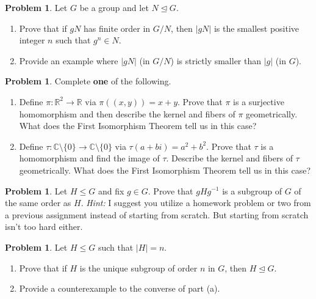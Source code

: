 \documentclass[11pt]{scrartcl}
\theoremstyle{definition}
\newtheorem{problem}[theorem]{Problem}
\begin{document}
\begin{problem}
Let $G$ be a group and let $N\unlhd G$. 
\begin{enumerate}[label=\rm{(\alph*)}]
\item Prove that if $gN$ has finite order in $G/N$, then $|gN|$ is the smallest positive integer $n$ such that $g^n\in N$.
\item Provide an example where $|gN|$ (in $G/N$) is strictly smaller than $|g|$ (in $G$).
\end{enumerate}
\end{problem}

\newpage

\begin{problem}
Complete \textbf{one} of the following.
\begin{enumerate}[label=\rm{(\alph*)}]
\item Define $\pi:\mathbb{R}^2\to \mathbb{R}$ via $\pi((x,y))=x+y$.  Prove that $\pi$ is a surjective homomorphism and then describe the kernel and fibers of $\pi$ geometrically.  What does the First Isomorphism Theorem tell us in this case?
\item Define $\tau:\mathbb{C}\setminus\{0\}\to\mathbb{C}\setminus\{0\}$ via $\tau(a+bi)=a^2+b^2$. Prove that $\tau$ is a homomorphism and find the image of $\tau$.  Describe the kernel and fibers of $\tau$ geometrically.  What does the First Isomorphism Theorem tell us in this case?
\end{enumerate}
\end{problem}

\begin{problem}
Let $H\leq G$ and fix $g\in G$. Prove that $gHg^{-1}$ is a subgroup of $G$ of the same order as $H$. \emph{Hint:} I suggest you utilize a homework problem or two from a previous assignment instead of starting from scratch.  But starting from scratch isn't too hard either.
\end{problem}

\begin{problem}
Let $H\leq G$ such that $|H|=n$. 
\begin{enumerate}[label=\rm{(\alph*)}]
\item Prove that if $H$ is the unique subgroup of order $n$ in $G$, then $H\unlhd G$.
\item Provide a counterexample to the converse of part (a).
\end{enumerate}
\end{problem}
\end{document}
